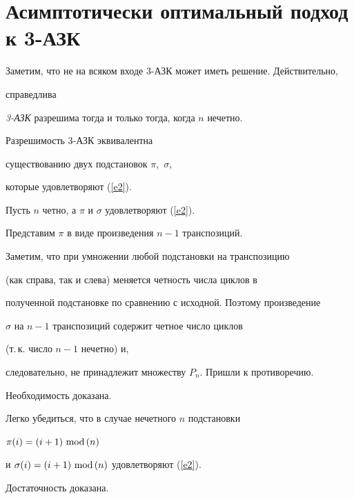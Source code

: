 \section{Асимптотически оптимальный подход к 3-АЗК}





Заметим, что не на всяком входе 3-АЗК может иметь решение. Действительно,


справедлива


 


\begin{lem}


\label{lm3}


{\em 3-АЗК} разрешима тогда и только тогда, когда $n$ нечетно.


\end{lem}





\begin{pf}


Разрешимость 3-АЗК эквивалентна


существованию двух подстановок $\pi$,~$\sigma$,


которые удовлетворяют (\ref{e2}).





Пусть $n$ четно, а $\pi$ и $\sigma$ удовлетворяют (\ref{e2}).


Представим $\pi$ в виде произведения $n-1$ транспозиций.


Заметим, что при умножении любой подстановки на транспозицию


(как справа, так и слева) меняется четность числа циклов в


полученной подстановке по сравнению с исходной. Поэтому произведение


$\sigma$ на $n-1$ транспозиций содержит четное число циклов 


(т.\,к. число $n-1$ нечетно) и,


следовательно, не принадлежит множеству $P_n$. Пришли к противоречию.


Необходимость доказана.





Легко убедиться, что в случае нечетного $n$ подстановки 


$\pi(i)= (i+1)\text{ mod\,}(n)$ 


и $\sigma(i)=(i+1)\text{ mod\,}(n)$ удовлетворяют (\ref{e2}). 


Достаточность доказана.


\end{pf}





